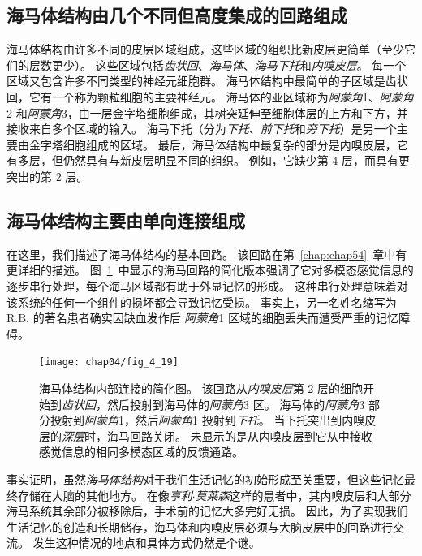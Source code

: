 \subsection{海马体结构由几个不同但高度集成的回路组成}

海马体结构由许多不同的皮层区域组成，这些区域的组织比新皮层更简单（至少它们的层数更少）。
这些区域包括\textit{齿状回}、\textit{海马体}、\textit{海马下托}和\textit{内嗅皮层}。 
每一个区域又包含许多不同类型的神经元细胞群。
海马体结构中最简单的子区域是齿状回，它有一个称为颗粒细胞的主要神经元。
海马体的亚区域称为\textit{阿蒙角}1、\textit{阿蒙角}2 和\textit{阿蒙角}3，由一层金字塔细胞组成，其树突延伸至细胞体层的上方和下方，并接收来自多个区域的输入。
海马下托（分为\textit{下托}、\textit{前下托}和\textit{旁下托}）是另一个主要由金字塔细胞组成的区域。
最后，海马体结构中最复杂的部分是内嗅皮层，它有多层，但仍然具有与新皮层明显不同的组织。
例如，它缺少第 4 层，而具有更突出的第 2 层。



\subsection{海马体结构主要由单向连接组成}

在这里，我们描述了海马体结构的基本回路。
该回路在第~\ref{chap:chap54}~章中有更详细的描述。
图~\ref{fig:4_19}~中显示的海马回路的简化版本强调了它对多模态感觉信息的逐步串行处理，每个海马区域都有助于外显记忆的形成。
这种串行处理意味着对该系统的任何一个组件的损坏都会导致记忆受损。
事实上，另一名姓名缩写为 R.B. 的著名患者确实因缺血发作后 \textit{阿蒙角}1 区域的细胞丢失而遭受严重的记忆障碍。


\begin{figure}[htbp]
	\centering
	\texttt{[image: chap04/fig\_4\_19]}
	\caption{海马体结构内部连接的简化图。 
		该回路从\textit{内嗅皮层}第 2 层的细胞开始到\textit{齿状回}，然后投射到海马体的\textit{阿蒙角}3 区。
		海马体的\textit{阿蒙角}3 部分投射到\textit{阿蒙角}1，然后\textit{阿蒙角}1 投射到\textit{下托}。
		当下托突出到内嗅皮层的\textit{深层}时，海马回路关闭。
		未显示的是从内嗅皮层到它从中接收感觉信息的相同多模态区域的反馈通路。}
	\label{fig:4_19}
\end{figure}


事实证明，虽然\textit{海马体结构}对于我们生活记忆的初始形成至关重要，但这些记忆最终存储在大脑的其他地方。
在像\textit{亨利$\cdot$莫莱森}这样的患者中，其内嗅皮层和大部分海马系统其余部分被移除后，手术前的记忆大多完好无损。
因此，为了实现我们生活记忆的创造和长期储存，海马体和内嗅皮层必须与大脑皮层中的回路进行交流。
发生这种情况的地点和具体方式仍然是个谜。



